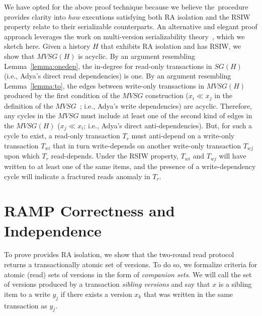 We have opted for the above proof technique because we believe
the~\transform procedure provides clarity into \textit{how} executions
satisfying both RA isolation and the RSIW property relate to their
serializable counterparts. An alternative and elegant proof approach
leverages the work on multi-version serializability
theory~\cite{bernstein-book}, which we sketch here. Given a
history $H$ that exhibits RA isolation and has RSIW, we show
that $MVSG(H)$ is acyclic. By an argument resembling
Lemma~\ref{lemma:onedep}, the in-degree for read-only transactions in
$SG(H)$ (i.e., Adya's direct read dependencies) is one. By an argument
resembling Lemma~\ref{lemma:to}, the edges between write-only
transactions in $MVSG(H)$ produced by the first condition of the
$MVSG$ construction ($x_i \ll x_j$ in the definition of the
$MVSG$~\cite[p. 152]{bernstein-book}; i.e., Adya's write dependencies)
are acyclic. Therefore, any cycles in the $MVSG$ must include at least
one of the second kind of edges in the $MVSG(H)$ ($x_j \ll x_i$; i.e.,
Adya's direct anti-dependencies). But, for such a cycle to exist, a
read-only transaction $T_r$ must anti-depend on a write-only
transaction $T_{wi}$ that in turn write-depends on another write-only
transaction $T_{wj}$ upon which $T_r$ read-depends. Under the RSIW
property, $T_{wi}$ and $T_{wj}$ will have written to at least one of
the same items, and the presence of a write-dependency cycle will
indicate a fractured reads anomaly in $T_r$.

\section{RAMP Correctness and Independence}

\label{sec:rampproofs}


 To prove \rapl provides RA isolation, we
show that the two-round read protocol returns a transactionally atomic
set of versions. To do so, we formalize criteria for atomic (read)
sets of versions in the form of \textit{companion sets}. We will call
the set of versions produced by a transaction \textit{sibling
  versions} and say that $x$ is a sibling item to a write $y_j$ if
there exists a version $x_k$ that was written in the same transaction
as $y_j$.

